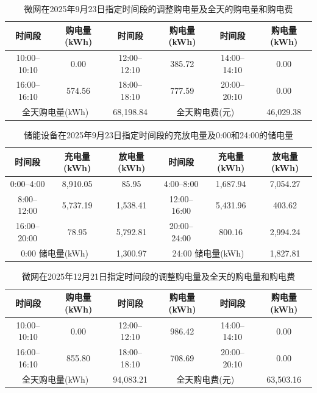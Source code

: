 \begin{table}[H]
  \centering
  \caption{微网在2025年9月23日指定时间段的调整购电量及全天的购电量和购电费}
  \label{tab:q3-adj-0923}
  \small
  \renewcommand{\arraystretch}{1.3}
  \begin{tabular}{|c|c|c|c|c|c|}
    \hline
    时间段 & 购电量(kWh) & 时间段 & 购电量(kWh) & 时间段 & 购电量(kWh) \\
    \hline
    10:00--10:10 & 0.00 & 12:00--12:10 & 385.72 & 14:00--14:10 & 0.00 \\
    \hline
    16:00--16:10 & 574.56 & 18:00--18:10 & 777.59 & 20:00--20:10 & 0.00 \\
    \hline
    \multicolumn{2}{|c|}{全天购电量(kWh)} & \multicolumn{1}{c|}{68{,}198.84} & \multicolumn{2}{c|}{全天购电费(元)} & \multicolumn{1}{c|}{46{,}029.38} \\
    \hline
  \end{tabular}
\end{table}

\begin{table}[H]
  \centering
  \caption{储能设备在2025年9月23日指定时间段的充放电量及0:00和24:00的储电量}
  \label{tab:q3-storage-0923}
  \small
  \renewcommand{\arraystretch}{1.3}
  \begin{tabular}{|c|c|c|c|c|c|}
    \hline
    时间段 & 充电量(kWh) & 放电量(kWh) & 时间段 & 充电量(kWh) & 放电量(kWh) \\
    \hline
    0:00--4:00 & 8{,}910.05 & 85.95 & 4:00--8:00 & 1{,}687.94 & 7{,}054.27 \\
    \hline
    8:00--12:00 & 5{,}737.19 & 1{,}538.41 & 12:00--16:00 & 5{,}431.96 & 403.62 \\
    \hline
    16:00--20:00 & 78.95 & 5{,}792.81 & 20:00--24:00 & 800.16 & 2{,}994.24 \\
    \hline
    \multicolumn{2}{|c|}{0:00 储电量(kWh)} & \multicolumn{1}{c|}{1{,}300.97} & \multicolumn{2}{c|}{24:00 储电量(kWh)} & \multicolumn{1}{c|}{1{,}827.81} \\
    \hline
  \end{tabular}
\end{table}

\begin{table}[H]
  \centering
  \caption{微网在2025年12月21日指定时间段的调整购电量及全天的购电量和购电费}
  \label{tab:q3-adj-1221}
  \small
  \renewcommand{\arraystretch}{1.3}
  \begin{tabular}{|c|c|c|c|c|c|}
    \hline
    时间段 & 购电量(kWh) & 时间段 & 购电量(kWh) & 时间段 & 购电量(kWh) \\
    \hline
    10:00--10:10 & 0.00 & 12:00--12:10 & 986.42 & 14:00--14:10 & 0.00 \\
    \hline
    16:00--16:10 & 855.80 & 18:00--18:10 & 708.69 & 20:00--20:10 & 0.00 \\
    \hline
    \multicolumn{2}{|c|}{全天购电量(kWh)} & \multicolumn{1}{c|}{94{,}083.21} & \multicolumn{2}{c|}{全天购电费(元)} & \multicolumn{1}{c|}{63{,}503.16} \\
    \hline
  \end{tabular}
\end{table}

